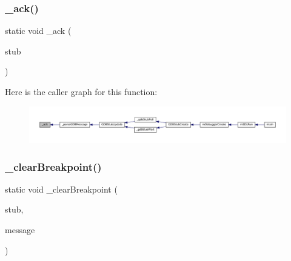 \subsubsection{\texorpdfstring{\+\_\+ack()}{\_ack()}}
{\footnotesize\ttfamily static void \+\_\+ack (\begin{DoxyParamCaption}\item[{struct G\+D\+B\+Stub $\ast$}]{stub }\end{DoxyParamCaption})\hspace{0.3cm}{\ttfamily [static]}}

Here is the caller graph for this function\+:
\nopagebreak
\begin{figure}[H]
\begin{center}
\leavevmode
\includegraphics[width=350pt]{gdb-stub_8c_abfab9a55492e6a7fc7ca801619550fb0_icgraph}
\end{center}
\end{figure}
\mbox{\label{gdb-stub_8c_a53d57d6dc1ec038bf80e8e8c9bd1f6a8}} 
\subsubsection{\texorpdfstring{\+\_\+clear\+Breakpoint()}{\_clearBreakpoint()}}
{\footnotesize\ttfamily static void \+\_\+clear\+Breakpoint (\begin{DoxyParamCaption}\item[{struct G\+D\+B\+Stub $\ast$}]{stub,  }\item[{const char $\ast$}]{message }\end{DoxyParamCaption})\hspace{0.3cm}{\ttfamily [static]}}

